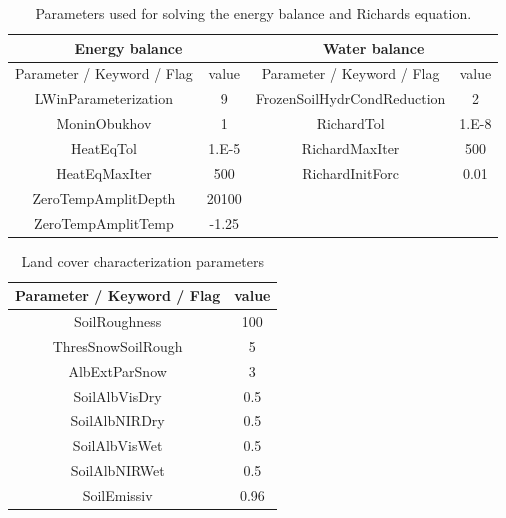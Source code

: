 \begin{table}[h!]
\begin{center}
\begin{tabular}[c]{|c|c||c|c|}
\hline
\multicolumn{2}{|c||}{Energy balance} & \multicolumn{2}{|c|}{Water balance}\\
\hline
Parameter / Keyword / Flag & value& Parameter / Keyword / Flag & value\\
\hline
LWinParameterization & 9 & FrozenSoilHydrCondReduction & 2\\
MoninObukhov & 1&  RichardTol & 1.E-8 \\
HeatEqTol & 1.E-5 & RichardMaxIter & 500\\
HeatEqMaxIter & 500 & RichardInitForc & 0.01 \\
ZeroTempAmplitDepth & 20100 &&\\
ZeroTempAmplitTemp & -1.25 &&\\
\hline
\end{tabular}
\caption{Parameters  used for solving the energy balance and Richards equation.}
\label{tab:energyBalance}
\end{center}
\end{table}

\vspace{-1.0cm}

\vspace{-1.0cm}
\begin{table}[h!]
\begin{center}
\begin{tabular}[c]{|c|c|}
\hline
Parameter / Keyword / Flag & value\\
\hline
SoilRoughness & 100 \\
ThresSnowSoilRough & 5 \\
AlbExtParSnow & 3 \\
SoilAlbVisDry & 0.5 \\
SoilAlbNIRDry & 0.5 \\
SoilAlbVisWet & 0.5 \\
SoilAlbNIRWet & 0.5 \\
SoilEmissiv & 0.96 \\
\hline
\end{tabular}
\caption{Land cover characterization parameters}
\label{tab:landCoverPar}
\end{center}
\end{table}

